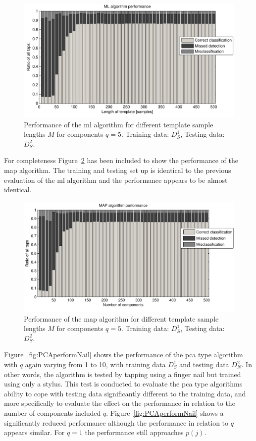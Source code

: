 \begin{figure}[!] %
\centering
\includegraphics[width=150mm]{MLperform.pdf}
\caption{Performance of the \gls{ml} algorithm for different template sample lengths $M$ for components $q=5$. Training data: $D^1_S$, Testing data: $D^2_S$.}\label{fig:MLperform}
\end{figure}

For completeness Figure~\ref{fig:MAPperformLength} has been included to show the performance of the \gls{map} algorithm. The training and testing set up is identical to the previous evaluation of the \gls{ml} algorithm and the performance appears to be almost identical.

\begin{figure}[!] %
\centering
\includegraphics[width=150mm]{MAPperformLength.pdf}
\caption{Performance of the \gls{map} algorithm for different template sample lengths $M$ for components $q=5$. Training data: $D^1_S$, Testing data: $D^2_S$.}\label{fig:MAPperformLength}
\end{figure}

Figure~\ref{fig:PCAperformNail} shows the performance of the \gls{pca} type algorithm with $q$ again varying from 1 to 10, with training data $D^1_S$ and testing data $D^2_N$. In other words, the algorithm is tested by tapping using a finger nail but trained using only a stylus. This test is conducted to evaluate the \gls{pca} type algorithms ability to cope with testing data significantly different to the training data, and more specifically to evaluate the effect on the performance in relation to the number of components included $q$. Figure~\ref{fig:PCAperformNail} shows a significantly reduced performance although the performance in relation to $q$ appears similar. For $q=1$ the performance still approaches $p(j)$.

